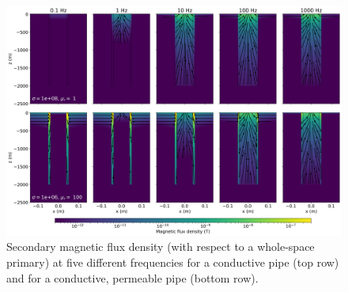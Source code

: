 \begin{figure}
    \begin{center}
    \includegraphics[width=\columnwidth]{figures/casing_software/bfdem.png}
    \end{center}
\caption{
    Secondary magnetic flux density (with respect to a whole-space primary) at five different frequencies for a conductive pipe (top row)
    and for a conductive, permeable pipe (bottom row).
}
\label{fig:bfdem}
\end{figure}
